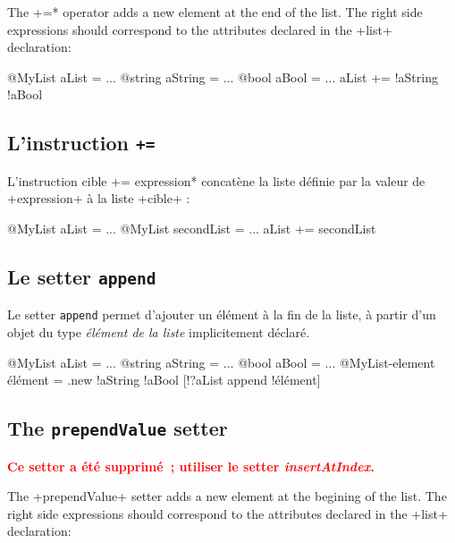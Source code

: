 
The  \ggs*+=* operator adds a new element at the end of the list. The right side expressions should correspond to the attributes declared in the \ggs+list+ declaration:\\

\begin{galgas}
@MyList aList = ...
@string aString = ...
@bool aBool = ...
aList += !aString !aBool
\end{galgas}


\subsection{L'instruction \texttt{+=}}

L'instruction \ggs*cible += expression* concatène la liste définie par la valeur de \ggs+expression+ à la liste \ggs+cible+ :

\begin{galgas}
@MyList aList = ...
@MyList secondList = ...
aList += secondList
\end{galgas}







\subsection{Le setter \texttt{append}}

Le setter \texttt{append} permet d'ajouter un élément à la fin de la liste, à partir d'un objet du type \emph{élément de la liste} implicitement déclaré.


\begin{galgas}
@MyList aList = ... 
@string aString = ... 
@bool aBool = ... 
@MyList-element élément = .new {!aString !aBool}
[!?aList append !élément]
\end{galgas}


\subsection{The \texttt{prependValue} setter}

{\bf \textcolor{red}{Ce setter a été supprimé~; utiliser le setter \emph{insertAtIndex}.}}

The \ggs+prependValue+ setter adds a new element at the begining of the list. The right side expressions should correspond to the attributes declared in the  \ggs+list+ declaration:

